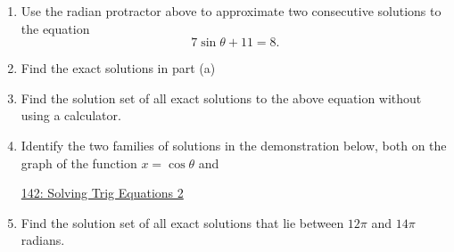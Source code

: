 \documentclass{ximera}
\begin{document}
\begin{question}  \label{QdfEEFR33g3e}

 
\begin{onlineOnly}
    \begin{center}
\end{center}
\end{onlineOnly}

\begin{enumerate}
\item Use the radian protractor above to approximate two consecutive solutions to the equation
\[
   7 \sin\theta +11 =  8 .  
\]

\item Find the exact solutions in part (a)

\item Find the solution set of all exact solutions to the above equation without using a calculator.

\item Identify the two families of solutions in the demonstration below, both on the graph of the function $x=\cos\theta$ and 

\href{https://www.desmos.com/calculator/vbvknimm85}{142: Solving Trig Equations 2}
 
\begin{onlineOnly}
    \begin{center}
\end{center}
\end{onlineOnly}

\item Find the solution set of all exact solutions that lie between $12\pi$ and $14\pi$ radians.

\end{enumerate}
\end{question}
\end{document}
